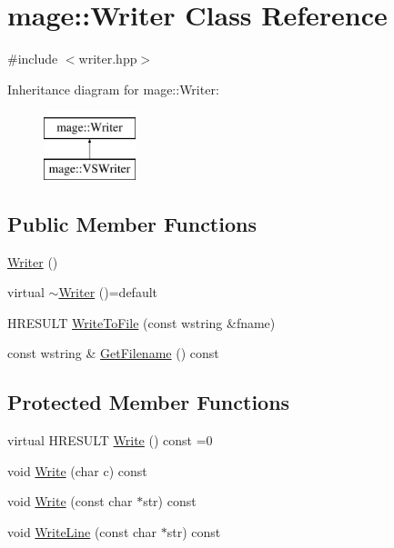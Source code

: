 \hypertarget{classmage_1_1_writer}{}\section{mage\+:\+:Writer Class Reference}
\label{classmage_1_1_writer}


{\ttfamily \#include $<$writer.\+hpp$>$}

Inheritance diagram for mage\+:\+:Writer\+:\begin{figure}[H]
\begin{center}
\leavevmode
\includegraphics[height=2.000000cm]{classmage_1_1_writer}
\end{center}
\end{figure}
\subsection*{Public Member Functions}
\begin{DoxyCompactItemize}
\item 
\hyperlink{classmage_1_1_writer_a40b6cd3005d509e670c5a49272d9ef27}{Writer} ()
\item 
virtual \hyperlink{classmage_1_1_writer_a04fe27246806384099d518231c75c09f}{$\sim$\+Writer} ()=default
\item 
H\+R\+E\+S\+U\+LT \hyperlink{classmage_1_1_writer_ae9250f340229ee80dc5c518045567f7d}{Write\+To\+File} (const wstring \&fname)
\item 
const wstring \& \hyperlink{classmage_1_1_writer_aa874f2ee6cdd6663078d213f10d984f1}{Get\+Filename} () const
\end{DoxyCompactItemize}
\subsection*{Protected Member Functions}
\begin{DoxyCompactItemize}
\item 
virtual H\+R\+E\+S\+U\+LT \hyperlink{classmage_1_1_writer_a674375dbb233dea030603212d4090c18}{Write} () const =0
\item 
void \hyperlink{classmage_1_1_writer_aaa7908147290e06991ef18d5931e606b}{Write} (char c) const
\item 
void \hyperlink{classmage_1_1_writer_a0ac4d904f988028361a99e1f25e273ab}{Write} (const char $\ast$str) const
\item 
void \hyperlink{classmage_1_1_writer_ab6f3d56fd4ff285af3a4bb292dba8271}{Write\+Line} (const char $\ast$str) const
\end{DoxyCompactItemize}
